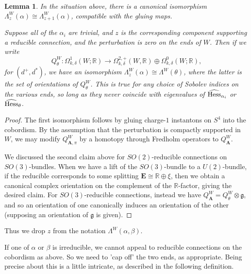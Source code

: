 \documentclass[10pt,a4paper]{amsart}
\newtheorem{lemma}[theorem]{Lemma}
\theoremstyle{definition}
\theoremstyle{remark}
\numberwithin{figure}{qchap}
\begin{document}
\begin{lemma}In the situation above, there is a canonical isomorphism $\Lambda_z^W(\alpha) \cong \Lambda_{z+1}^W(\alpha)$, compatible with the gluing maps.

Suppose all of the $\alpha_i$ are trivial, and $z$ is the corresponding component supporting a reducible connection, and the perturbation is zero on the ends of $W$. Then if we write $$Q^W_\theta: \Omega^1_{k,\delta}(W;\mathbb R) \to \Omega^{2,+}_{k,\delta}(W, \mathbb R) \oplus \Omega^0_{k,\delta}(W; \mathbb R),$$ for $(d^+, d^*)$, we have an isomorphism $\Lambda_z^W(\alpha) \cong \Lambda^W(\theta)$, where the latter is the set of orientations of $Q^W_\theta$. This is true for any choice of Sobolev indices on the various ends, so long as they never coincide with eigenvalues of $\widehat{\textup{Hess}}_{\alpha_i}$ or $\widehat{\textup{Hess}}_\theta$.
\end{lemma}
\begin{proof}The first isomorphism follows by gluing charge-$1$ instantons on $S^4$ into the cobordism. By the assumption that the perturbation is compactly supported in $W$, we may modify $Q^W_{\mathbf{A},\pi}$ by a homotopy through Fredholm operators to $Q^W_{\mathbf{A}}$.

We discussed the second claim above for $SO(2)$-reducible connections on $SO(3)$-bundles. When we have a lift of the $SO(3)$-bundle to a $U(2)$-bundle, if the reducible corresponds to some splitting $\mathbf{E} \cong \mathbb R \oplus \xi$, then we obtain a canonical complex orientation on the complement of the $\mathbb R$-factor, giving the desired claim. For $SO(3)$-reducible connections, instead we have $Q^W_{\mathbf{A}} = Q^W_\theta \otimes \mathfrak g$, and so an orientation of one canonically induces an orientation of the other (supposing an orientation of $\mathfrak g$ is given).
\end{proof}

Thus we drop $z$ from the notation $\Lambda^W(\alpha, \beta)$.

If one of $\alpha$ or $\beta$ is irreducible, we cannot appeal to reducible connections on the cobordism as above. So we need to 'cap off' the two ends, as appropriate. Being precise about this is a little intricate, as described in the following definition.
\end{document}

